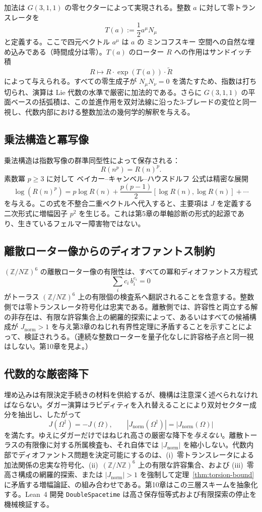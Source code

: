 \documentclass[a4paper]{article}
\theoremstyle{definition}
\theoremstyle{remark}
\newcommand{\Jnorm}{J_{\mathrm{norm}}}
\begin{document}
加法は \( G(3,1,1) \) の零セクターによって実現される。整数 \( a \) に対して零トランスレータを
\[
T(a) := \frac12 a^\mu N_\mu
\]
と定義する。ここで四元ベクトル \( a^\mu \) は \( a \) の ミンコフスキー 空間への自然な埋め込みである（時間成分は零）。\( T(a) \) のローター \( R \) への作用はサンドイッチ積
\[
R \mapsto R \cdot \exp(T(a)) \cdot \widetilde{R}
\]
によって与えられる。すべての零生成子が \( N_\mu N_\nu = 0 \) を満たすため、指数は打ち切られ、演算は Lie 代数の水準で厳密に加法的である。さらに \(G(3,1,1)\) の平面ベースの括弧積は、この並進作用を双対法線に沿った3-ブレードの変位と同一視し、代数内部における整数加法の幾何学的解釈を与える。

\subsection{乗法構造と冪写像}

乗法構造は指数写像の群準同型性によって保存される：
\[
R(n^p) = R(n)^p.
\]
素数冪 \( p \geq 3 \) に対して ベイカー–キャンベル–ハウスドルフ 公式は精密な展開
\[
\log(R(n)^p) = p \log R(n) + \frac{p(p-1)}{2} [\log R(n), \log R(n)] + \cdots
\]
を与える。この式を不整合二重ベクトルへ代入すると、主要項は \( J \) を定義する二次形式に増幅因子 \( p^2 \) を生じる。これは第5章の単軸診断の形式的起源であり、生きているフェルマー障害物ではない。

\subsection{離散ローター像からのディオファントス制約}

\((\mathbb{Z}/N\mathbb{Z})^6\) の離散ローター像の有限性は、すべての冪和ディオファントス方程式
\[
\sum_i c_i\, b_i^{e_i} = 0
\]
がトーラス \( (\mathbb{Z}/N\mathbb{Z})^6 \) 上の有限個の検査系へ翻訳されることを含意する。整数側では零トランスレータ符号化は忠実である。離散側では、許容性と両立する解の非存在は、有限な許容集合上の網羅的探索によって、あるいはすべての候補構成が \( \Jnorm > 1 \) を与え第3章のねじれ有界性定理に矛盾することを示すことによって、検証されうる。（連続な整数ローターを量子化なしに許容格子点と同一視はしない。第10章を見よ。）


\subsection{代数的な厳密降下}

\label{sec:ch4-descent}
埋め込みは有限決定手続きの材料を供給するが、機構は注意深く述べられなければならない。ダガー演算はラピディティを入れ替えることにより双対セクター成分を抽出し、したがって
\[
J(\Omega^\dagger)=-J(\Omega),\qquad |\Jnorm(\Omega^\dagger)|=|\Jnorm(\Omega)|
\]
を満たす。ゆえにダガーだけではねじれ高さの厳密な降下を\emph{与えない}。離散トーラスの有限像に対する所属検査も、それ自体では \(|\Jnorm|\) を縮小しない。代数内部でディオファントス問題を決定可能にするのは、(i)~零トランスレータによる加法関係の忠実な符号化、(ii)~\((\mathbb{Z}/N\mathbb{Z})^6\) 上の有限な許容集合、および (iii)~零高さ構成の網羅的探索、または \(|\Jnorm|>1\) を強制して定理~\ref{thm:torsion-bound} に矛盾する増幅論証、の組み合わせである。第10章はこの三層スキームを抽象化する。Lean~4 開発 \texttt{DoubleSpacetime} は高さ保存恒等式および有限探索の停止を機械検証する。
\end{document}
